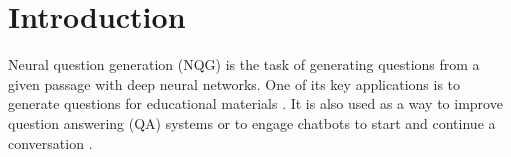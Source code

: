 \documentclass[letterpaper]{article} %
\newcommand{\jb}[1]{\textcolor{cyan}{#1}}
\begin{document}
\section{Introduction}

\noindent Neural question generation (NQG) is the task of generating questions from a given passage with deep neural networks. 
One of its key applications is to generate questions for educational materials \cite{heilman2010good}. It is also used as a way to improve question answering (QA) systems \cite{duan2017question,tang2017question,tang2018learning} or to engage chatbots to start and continue a conversation \cite{mostafazadeh2016generating}. 
% 
% 
% 
% 
% 
\end{document}
